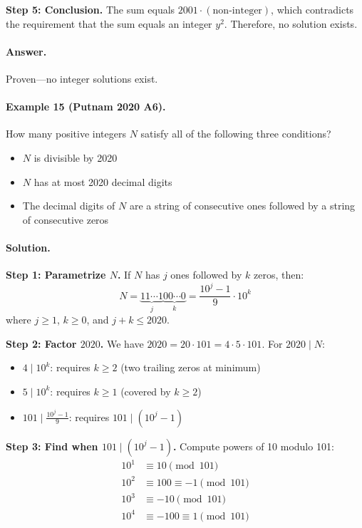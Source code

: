 \documentclass[12pt]{extarticle}
\begin{document}
\textbf{Step 5: Conclusion.} The sum equals $2001 \cdot (\text{non-integer})$, which contradicts the requirement that the sum equals an integer $y^2$. Therefore, no solution exists.

\paragraph{Answer.} Proven—no integer solutions exist.

\paragraph{Example 15 (Putnam 2020 A6).} How many positive integers $N$ satisfy all of the following three conditions?
\begin{itemize}
    \item[(i)] $N$ is divisible by 2020
    \item[(ii)] $N$ has at most 2020 decimal digits
    \item[(iii)] The decimal digits of $N$ are a string of consecutive ones followed by a string of consecutive zeros
\end{itemize}

\paragraph{Solution.}
\textbf{Step 1: Parametrize $N$.} If $N$ has $j$ ones followed by $k$ zeros, then:
\[
N = \underbrace{11\cdots1}_{j} \underbrace{00\cdots0}_{k} = \frac{10^j - 1}{9} \cdot 10^k
\]
where $j \ge 1$, $k \ge 0$, and $j + k \le 2020$.

\textbf{Step 2: Factor $2020$.} We have $2020 = 20 \cdot 101 = 4 \cdot 5 \cdot 101$. For $2020 \mid N$:
\begin{itemize}
    \item $4 \mid 10^k$: requires $k \ge 2$ (two trailing zeros at minimum)
    \item $5 \mid 10^k$: requires $k \ge 1$ (covered by $k \ge 2$)
    \item $101 \mid \frac{10^j - 1}{9}$: requires $101 \mid (10^j - 1)$
\end{itemize}

\textbf{Step 3: Find when $101 \mid (10^j - 1)$.} Compute powers of 10 modulo 101:
\begin{align*}
10^1 &\equiv 10 \pmod{101} \\
10^2 &\equiv 100 \equiv -1 \pmod{101} \\
10^3 &\equiv -10 \pmod{101} \\
10^4 &\equiv -100 \equiv 1 \pmod{101}
\end{align*}
\end{document}
